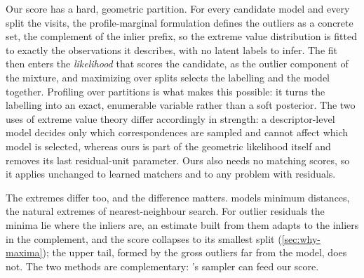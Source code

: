 Our score has a hard, geometric partition.  For every candidate model and
every split the \sortsweep visits, the profile-marginal formulation defines
the outliers as a concrete set, the complement of the inlier prefix, so the
extreme value distribution is fitted to exactly the observations it
describes, with no latent labels to infer.  The fit then enters the
\emph{likelihood} that scores the candidate, as the outlier component of the
mixture, and maximizing over splits selects the labelling and the model
together.  Profiling over partitions is what makes this possible: it turns
the labelling into an exact, enumerable variable rather than a soft
posterior.  The two uses of extreme value theory differ accordingly in
strength: a descriptor-level model decides only which correspondences are
sampled and cannot affect which model is selected, whereas ours is part of
the geometric likelihood itself and removes its last residual-unit
parameter.  Ours also needs no matching scores, so it applies unchanged to
learned matchers and to any problem with residuals.

The extremes differ too, and the difference matters.  \evsac models minimum
distances, the natural extremes of nearest-neighbour search.  For outlier
residuals the minima lie where the inliers are, an estimate built from them
adapts to the inliers in the complement, and the score collapses to its
smallest split (\cref{sec:why-maxima}); the upper tail, formed by the gross
outliers far from the model, does not.  The two methods are complementary:
\evsac's sampler can feed our score.
